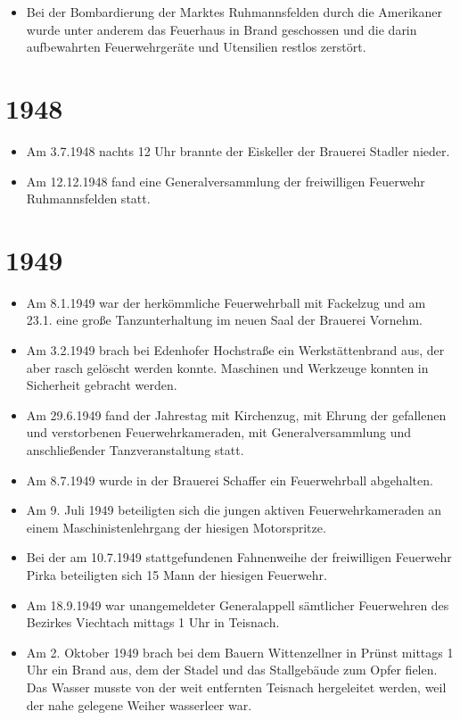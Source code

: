 \documentclass[12pt,a4paper]{book}
\begin{document}
\begin{itemize}
\item Bei der Bombardierung der Marktes Ruhmannsfelden durch die Amerikaner
wurde unter anderem das Feuerhaus in Brand geschossen und die darin aufbewahrten
Feuerwehrgeräte und Utensilien restlos zerstört.
\end{itemize}

\section*{1948}

\begin{itemize}
\item Am 3.7.1948 nachts 12 Uhr brannte der Eiskeller der Brauerei Stadler
nieder.

\item Am 12.12.1948 fand eine Generalversammlung der freiwilligen Feuerwehr
Ruhmannsfelden statt.
\end{itemize}

\section*{1949}

\begin{itemize}
\item Am 8.1.1949 war der herkömmliche Feuerwehrball mit Fackelzug und am 23.1.
eine große Tanzunterhaltung im neuen Saal der Brauerei Vornehm.

\item Am 3.2.1949 brach bei Edenhofer Hochstraße ein Werkstättenbrand aus, der
aber rasch gelöscht werden konnte. Maschinen und Werkzeuge konnten in Sicherheit
gebracht werden.

\item Am 29.6.1949 fand der Jahrestag mit Kirchenzug, mit Ehrung der gefallenen
und verstorbenen Feuerwehrkameraden, mit Generalversammlung und anschließender
Tanzveranstaltung statt.

\item Am 8.7.1949 wurde in der Brauerei Schaffer ein Feuerwehrball abgehalten.

\item Am 9. Juli 1949 beteiligten sich die jungen aktiven Feuerwehrkameraden an
einem Maschinistenlehrgang der hiesigen Motorspritze.

\item Bei der am 10.7.1949 stattgefundenen Fahnenweihe der freiwilligen
Feuerwehr Pirka beteiligten sich 15 Mann der hiesigen Feuerwehr.

\item Am 18.9.1949 war unangemeldeter Generalappell sämtlicher Feuerwehren des
Bezirkes Viechtach mittags 1 Uhr in Teisnach.

\item Am 2. Oktober 1949 brach bei dem Bauern Wittenzellner in Prünst mittags 1
Uhr ein Brand aus, dem der Stadel und das Stallgebäude zum Opfer fielen. Das
Wasser musste von der weit entfernten Teisnach hergeleitet werden, weil der nahe
gelegene Weiher wasserleer war.
\end{itemize}
\end{document}

